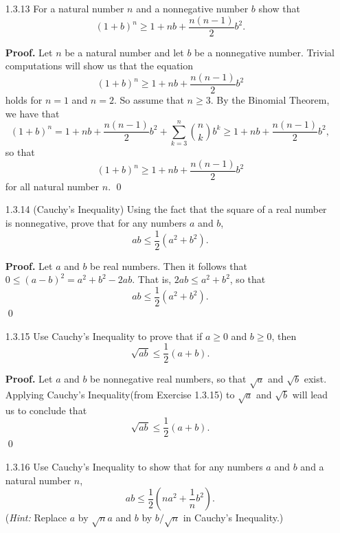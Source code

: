 \begin{enumerate}
      Thus \eqref{1_3_12_1} holds for $k + 1$; and hence, by the Principle of 
      Mathematical Induction, it holds for all natural number $n$. \qed
   \item[1.3.13]  For a natural number $n$ and a nonnegative number $b$ show
                  that
                  $$(1 + b)^n \ge 1 + nb + \frac{n(n - 1)}{2}b^2.$$

      \textbf{Proof.} Let $n$ be a natural number and let $b$ be a nonnegative
      number. Trivial computations will show us that the equation
      \begin{equation}
         (1 + b)^n \ge 1 + nb + \frac{n(n - 1)}{2}b^2 \label{1_3_13_1}
      \end{equation}
      holds for $n = 1$ and $n = 2$. So assume that $n \ge 3$. By the Binomial
      Theorem, we have that
      $$(1 + b)^n = 1 + nb + \frac{n(n - 1)}{2}b^2 +
         \sum_{k=3}^n\binom{n}{k}b^k \ge 1 + nb + \frac{n(n - 1)}{2}b^2,$$
      so that
      $$(1 + b)^n \ge 1 + nb + \frac{n(n - 1)}{2}b^2$$
      for all natural number $n$. \qed
   \item[1.3.14]  (Cauchy's Inequality) Using the fact that the square of a real
                  number is nonnegative, prove that for any numbers $a$ and $b$,
                  $$ab \le \frac{1}{2}(a^2 + b^2).$$

      \textbf{Proof.} Let $a$ and $b$ be real numbers. Then it follows that
      $0 \le (a - b)^2 = a^2 + b^2 - 2ab$. That is, $2ab \le a^2 + b^2$, so that
      $$ab \le \frac{1}{2}(a^2 + b^2).$$ \qed
   \item[1.3.15]  Use Cauchy's Inequality to prove that if $a \ge 0$ and
                  $b \ge 0$, then
                  $$\sqrt{ab} \le \frac{1}{2}(a + b).$$

      \textbf{Proof.} Let $a$ and $b$ be nonnegative real numbers, so that
      $\sqrt{a}$ and $\sqrt{b}$ exist. Applying Cauchy's Inequality(from
      Exercise 1.3.15) to $\sqrt{a}$ and $\sqrt{b}$ will lead us to conclude
      that
      $$\sqrt{ab} \le \frac{1}{2}(a + b).$$ \qed
   \item[1.3.16]  Use Cauchy's Inequality to show that for any numbers $a$ and
                  $b$ and a natural number $n$,
                  $$ab \le \frac{1}{2}(na^2 + \frac{1}{n}b^2).$$
                  (\textit{Hint:} Replace $a$ by $\sqrt{n}a$ and $b$ by
                   $b/\sqrt{n}$ in Cauchy's Inequality.)


\end{enumerate}
